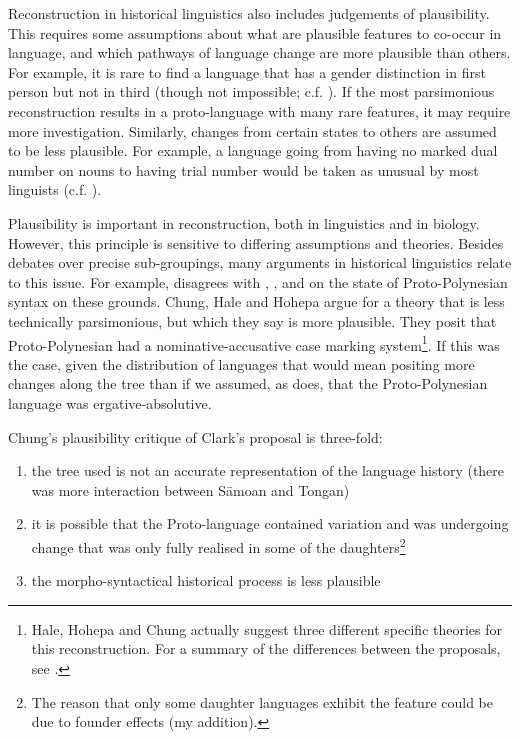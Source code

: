 \documentclass[draft,10pt]{article} %
\begin{document}
Reconstruction in historical linguistics also includes judgements of plausibility. This requires some assumptions about what are plausible features to co-occur in language, and which pathways of language change are more plausible than others. For example, it is rare to find a language that has a gender distinction in first person but not in third (though not impossible; c.f. \citet{wals-44}). If the most parsimonious reconstruction results in a proto-language with many rare features, it may require more investigation. Similarly, changes from certain states to others are assumed to be less plausible. For example, a language going from having no marked dual number on nouns to having trial number would be taken as unusual by most linguists (c.f. \citet[8]{kikusawa_2006_pro_number}). 

Plausibility is important in reconstruction, both in linguistics and in biology. However, this principle is sensitive to differing assumptions and theories. Besides debates over precise sub-groupings, many arguments in historical linguistics relate to this issue. For example, \citet{clark1976aspects} disagrees with \citet{hale_1968}, \citet{hohepa_1969}, and \citet{chung1978} on the state of Proto-Polynesian syntax on these grounds. Chung, Hale and Hohepa argue for a theory that is less technically parsimonious, but which they say is more plausible. They posit that Proto-Polynesian had a nominative-accusative case marking system\footnote{Hale, Hohepa and Chung actually suggest three different specific theories for this reconstruction. For a summary of the differences between the proposals, see \citet[247-249]{chung1978}.}. If this was the case, given the distribution of languages that would mean positing more changes along the tree than if we assumed, as \citet{clark1976aspects} does, that the Proto-Polynesian language was ergative-absolutive. 

Chung's plausibility critique of Clark's proposal is three-fold: 
\begin{enumerate}[label=(\alph*)]
\item the tree used is not an accurate representation of the language history (there was more interaction between S\={a}moan and Tongan)
\item it is possible that the Proto-language contained variation and was undergoing change that was only fully realised in some of the daughters\footnote{The reason that only some daughter languages exhibit the feature could be due to founder effects (my addition).} 
\item the morpho-syntactical historical process is less plausible
\end{enumerate}
\end{document}
